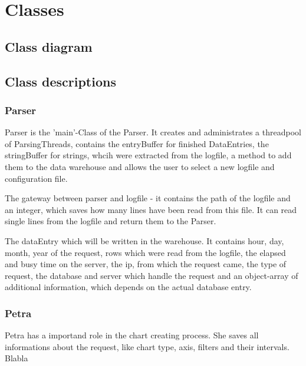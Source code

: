 \section{Classes}

\subsection{Class diagram}

\subsection{Class descriptions}

\subsubsection{Parser}

Parser is the 'main'-Class of the Parser. It creates and administrates a threadpool of ParsingThreads,
contains the entryBuffer for finished DataEntries, the stringBuffer for strings, whcih were extracted
from the logfile, a method to add them to the data warehouse
and allows the user to select a new logfile and configuration file.

The gateway between parser and logfile - it contains the path of the logfile and an integer, 
which saves how many lines have been read from this file. It can read single lines from the logfile and return them to 
the Parser.

The dataEntry which will be written in the warehouse. It contains hour, day, month, year of the request, rows which were read 
from the logfile, the elapsed and busy time on the server, the ip, from which the request came, the type of request, the database
and server which handle the request and an object-array of additional information, which depends on the actual database entry.

\subsubsection*{Petra}
Petra has a importand role in the chart creating process. She saves all informations about the request,
like chart type, axis, filters and their intervals. Blabla
